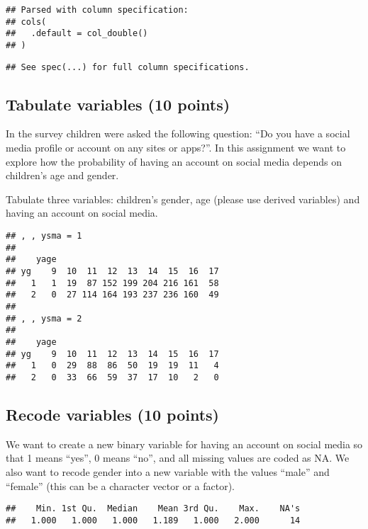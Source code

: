 \documentclass[
]{article}
\begin{document}
\begin{verbatim}
## Parsed with column specification:
## cols(
##   .default = col_double()
## )
\end{verbatim}

\begin{verbatim}
## See spec(...) for full column specifications.
\end{verbatim}

\hypertarget{tabulate-variables-10-points}{%
\subsection{Tabulate variables (10
points)}\label{tabulate-variables-10-points}}

In the survey children were asked the following question: ``Do you have
a social media profile or account on any sites or apps?''. In this
assignment we want to explore how the probability of having an account
on social media depends on children's age and gender.

Tabulate three variables: children's gender, age (please use derived
variables) and having an account on social media.

\begin{verbatim}
## , , ysma = 1
## 
##    yage
## yg    9  10  11  12  13  14  15  16  17
##   1   1  19  87 152 199 204 216 161  58
##   2   0  27 114 164 193 237 236 160  49
## 
## , , ysma = 2
## 
##    yage
## yg    9  10  11  12  13  14  15  16  17
##   1   0  29  88  86  50  19  19  11   4
##   2   0  33  66  59  37  17  10   2   0
\end{verbatim}

\hypertarget{recode-variables-10-points}{%
\subsection{Recode variables (10
points)}\label{recode-variables-10-points}}

We want to create a new binary variable for having an account on social
media so that 1 means ``yes'', 0 means ``no'', and all missing values
are coded as NA. We also want to recode gender into a new variable with
the values ``male'' and ``female'' (this can be a character vector or a
factor).

\begin{verbatim}
##    Min. 1st Qu.  Median    Mean 3rd Qu.    Max.    NA's 
##   1.000   1.000   1.000   1.189   1.000   2.000      14
\end{verbatim}
\end{document}

